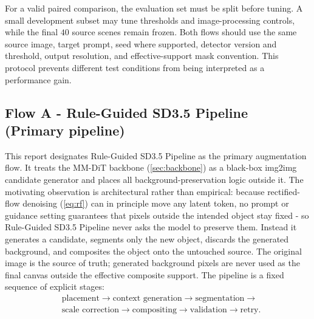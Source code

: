 \documentclass[11pt,a4paper]{article}
\newcommand{\rgp}{Rule-Guided SD3.5 Pipeline\xspace}  %
\begin{document}
For a valid paired comparison, the evaluation set must be split before tuning. A small development subset may tune thresholds and image-processing controls, while the final $40$ source scenes remain frozen. Both flows should use the same source image, target prompt, seed where supported, detector version and threshold, output resolution, and effective-support mask convention. This protocol prevents different test conditions from being interpreted as a performance gain.

\subsection{Flow A - Rule-Guided SD3.5 Pipeline (Primary pipeline)}\label{sec:v5}
This report designates \rgp as the primary augmentation flow. It treats the MM-DiT backbone (\cref{sec:backbone}) as a black-box
img2img candidate generator and places all background-preservation
logic outside it. The motivating observation is architectural rather than
empirical: because rectified-flow denoising (\cref{eq:rf}) can in principle move
any latent token, no prompt or guidance setting guarantees that pixels
outside the intended object stay fixed - so \rgp never asks the model to
preserve them. Instead it generates a candidate, segments only the new
object, discards the generated background, and composites the object onto the
untouched source. The original image is the source of truth; generated
background pixels are never used as the final canvas outside the effective
composite support. The pipeline is a fixed sequence of
explicit stages:
\begin{equation}\label{eq:v5}
  \begin{aligned}
  &\text{placement}\to\text{context generation}\to\text{segmentation}\to\\
  &\text{scale correction}\to\text{compositing}\to\text{validation}\to\text{retry}.
  \end{aligned}
\end{equation}
\end{document}
